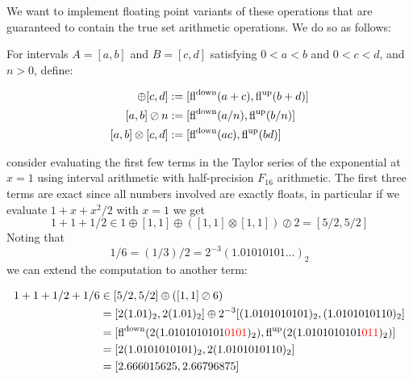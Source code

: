 We want to  implement floating point variants of these operations that are guaranteed to contain the true set arithmetic operations. We do so as follows:

\begin{definition} For intervals  $A = [a,b]$ and $B = [c,d]$ satisfying $0 < a < b$ and $0 < c < d$, and $n > 0$, define:


\begin{align*}
[a,b] \ensuremath{\oplus} [c,d] &:= [{\rm fl}^{\rm down}(a+c), {\rm fl}^{\rm up}(b+d)] \\
[a,b] \ensuremath{\oslash} n &:= [{\rm fl}^{\rm down}(a/n), {\rm fl}^{\rm up}(b/n)] \\
[a,b] \ensuremath{\otimes} [c,d] &:= [{\rm fl}^{\rm down}(ac), {\rm fl}^{\rm up}(bd)]
\end{align*}
\end{definition}

\begin{example} consider evaluating the first few terms in the Taylor series of the exponential at $x = 1$ using interval arithmetic with half-precision $F_{16}$ arithmetic.  The first three terms are exact since all numbers involved are exactly floats, in particular if we evaluate $1 + x + x^2/2$ with $x = 1$ we get
\[
1 + 1 + 1/2 \ensuremath{\in} 1 \ensuremath{\oplus} [1,1] \ensuremath{\oplus} ([1,1] \ensuremath{\otimes} [1,1]) \ensuremath{\oslash} 2 = [5/2, 5/2]
\]
Noting that 
\[
1/6 = (1/3)/2 = 2^{-3} (1.01010101\ensuremath{\ldots})_2
\]
we can extend the computation to another term:


\begin{align*}
1 + 1 + 1/2 + 1/6 &\ensuremath{\in} [5/2,5/2] \ensuremath{\oplus} ([1,1] \ensuremath{\oslash} 6) \ccr
= [2 (1.01)_2, 2 (1.01)_2] \ensuremath{\oplus} 2^{-3}[(1.0101010101)_2, (1.0101010110)_2] \ccr
= [{\rm fl}^{\rm down}(2 (1.0101010101\red{0101})_2), {\rm fl}^{\rm up}(2 (1.0101010101\red{011})_2)] \ccr
= [2(1.0101010101)_2, 2(1.0101010110)_2] \ccr 
= [2.666015625, 2.66796875]
\end{align*}
\end{example}

